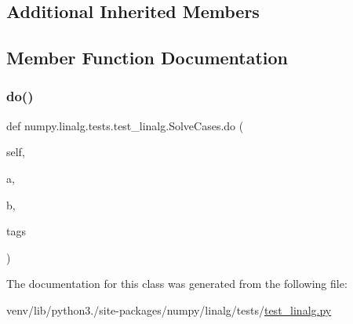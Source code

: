 \subsection*{Additional Inherited Members}


\subsection{Member Function Documentation}
\mbox{\label{classnumpy_1_1linalg_1_1tests_1_1test__linalg_1_1SolveCases_a2e1280444090bc4274ad6c6ec38c5ee4}} 
\subsubsection{\texorpdfstring{do()}{do()}}
{\footnotesize\ttfamily def numpy.\+linalg.\+tests.\+test\+\_\+linalg.\+Solve\+Cases.\+do (\begin{DoxyParamCaption}\item[{}]{self,  }\item[{}]{a,  }\item[{}]{b,  }\item[{}]{tags }\end{DoxyParamCaption})}



The documentation for this class was generated from the following file\+:\begin{DoxyCompactItemize}
\item 
venv/lib/python3./site-\/packages/numpy/linalg/tests/\hyperlink{test__linalg_8py}{test\+\_\+linalg.\+py}\end{DoxyCompactItemize}
